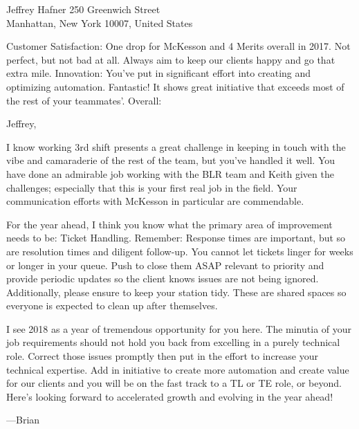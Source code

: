\documentclass[
    bstinga,
    foldmarks=true,
    pagenumber=false,
    addrfield=true,
    backaddress=false,
    paper=letter,
]{scrlttr2}
\date{Jan 30, 2018}
\begin{document}
\begin{letter}{Jeffrey Hafner}{
    250 Greenwich Street \\
    Manhattan, New York 10007, United States}
   



\opening{}

Customer Satisfaction: One drop for McKesson and 4 Merits overall in 2017. 
Not perfect, but not bad at all. 
Always aim to keep our clients happy and go that extra mile.
Innovation: You've put in significant effort into creating and optimizing automation. 
Fantastic! It shows great initiative that exceeds most of the rest of your teammates'.
Overall:

            Jeffrey,

I know working 3rd shift presents a great challenge in keeping in touch with the vibe and camaraderie of the rest of the team, but you've handled it well. 
You have done an admirable job working with the BLR team and Keith given the challenges; especially that this is your first real job in the field. 
Your communication efforts with McKesson in particular are commendable.

For the year ahead, I think you know what the primary area of improvement needs to be: Ticket Handling. 
Remember: Response times are important, but so are resolution times and diligent follow-up. 
You cannot let tickets linger for weeks or longer in your queue. 
Push to close them ASAP relevant to priority and provide periodic updates so the client knows issues are not being ignored.
Additionally, please ensure to keep your station tidy. 
These are shared spaces so everyone is expected to clean up after themselves.

I see 2018 as a year of tremendous opportunity for you here. 
The minutia of your job requirements should not hold you back from excelling in a purely technical role. 
Correct those issues promptly then put in the effort to increase your technical expertise. 
Add in initiative to create more automation and create value for our clients and you will be on the fast track to a TL or TE role, or beyond.  
Here's looking forward to accelerated growth and evolving in the year ahead!

\closing{---Brian}
\end{letter}
\end{document}
